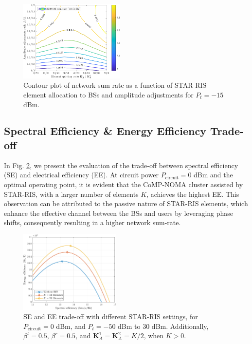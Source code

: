 \documentclass[conference]{IEEEtran}
\begin{document}
\begin{figure}[t!]
    \centering
    \includegraphics[width=0.47\textwidth]{figs/dynamic_s.pdf}
    \caption{Contour plot of network sum-rate as a function of STAR-RIS element allocation to BSs and amplitude adjustments for $P_t =-15$ dBm.}
    \label{fig:dynamic}
\end{figure}

\subsection{Spectral Efficiency \& Energy Efficiency Trade-off}
In Fig. \ref{fig:se_vs_ee}, we present the evaluation of the trade-off between spectral efficiency (SE) and electrical efficiency (EE). At circuit power $P_{\text{circuit}} = 0$ dBm and the optimal operating point, it is evident that the CoMP-NOMA cluster assisted by STAR-RIS, with a larger number of elements $K$, achieves the highest EE. This observation can be attributed to the passive nature of STAR-RIS elements, which enhance the effective channel between the BSs and users by leveraging phase shifts, consequently resulting in a higher network sum-rate.
\begin{figure}[t!]
    \centering
    \includegraphics[width=0.45\textwidth]{figs/se_vs_ee.pdf}
    \caption{SE and EE trade-off with different STAR-RIS settings, for $P_{\text{circuit}} = 0$ dBm, and $P_t=-50$ dBm to $30$ dBm. Additionally, $\beta^t=0.5$, $\beta^r=0.5$, and $\textbf{K}_A^1=\textbf{K}_A^2=K/2$, when $K > 0$.}
    \label{fig:se_vs_ee}
\end{figure}
\end{document}
